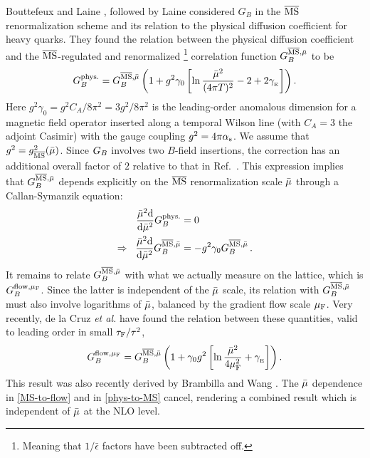 \documentclass[floatfix,twocolumn,prd,showpacs,preprintnumbers,amsmath,nofootinbib,amssymb,superscriptaddress]{revtex4-2}
\def\ccite#1{Ref.~\cite{#1}} %
\begin{document}
Bouttefeux and Laine \cite{Bouttefeux:2020ycy}, followed by Laine \cite{Laine:2021uzs} considered $G_B$ in the $\overline{\text{MS}}$ renormalization scheme and its relation to the physical diffusion coefficient for heavy quarks.
They found the relation between the physical diffusion coefficient and the $\overline{\text{MS}}$-regulated and renormalized%
\footnote{Meaning that $1/\bar\epsilon$ factors have been subtracted off.}
correlation function $G_{B}^{\overline{\text{MS}},\bar{\mu}}$ to be
\begin{equation}
\label{phys-to-MS}
    G_B^{\text{phys.}} = G_{B}^{\overline{\text{MS}},\bar{\mu}} \left( 1 + g^2 \gamma_0 \left[
    \ln \frac{\bar{\mu}^2}{(4\pi T)^2} - 2 + 2 \gamma_{_{\mathrm{E}}}
    \right] \right) .
\end{equation}
Here $g^2 \gamma_0 = g^2 C_A/8\pi^2 = 3g^2/8\pi^2$ is the leading-order anomalous dimension for a magnetic field operator inserted along a temporal Wilson line (with $C_A=3$ the adjoint Casimir) with the gauge coupling $g^2=4\pi \alpha_{\mathrm{s}}$. 
We assume that $g^2 = g^2_{\overline{\text{MS}}}(\bar{\mu})$.
Since $G_B$ involves two $B$-field insertions, the correction has an additional overall factor of $2$ relative to that in \ccite{Laine:2021uzs}.
This expression implies that $G_{B}^{\overline{\text{MS}},\bar{\mu}}$ depends explicitly on the $\overline{\text{MS}}$ renormalization scale $\bar{\mu}$ through a Callan-Symanzik equation:
\begin{align}
\label{CallanSymanzik}
    \frac{\bar{\mu}^2 \mathrm{d}}{\mathrm{d}\bar{\mu}^2} G_B^{\text{phys.}} & = 0 \nonumber \\
    \Rightarrow \;\;
    \frac{\bar{\mu}^2 \mathrm{d}}{\mathrm{d}\bar{\mu}^2} G_{B}^{\overline{\text{MS}},\bar{\mu}} & = - g^2 \gamma_0 G_{B}^{\overline{\text{MS}},\bar{\mu}}\,.
\end{align}
It remains to relate $G_{B}^{\overline{\text{MS}},\bar{\mu}}$ with what we actually measure on the lattice, which is $G_{B}^{\mathrm{flow}, \mu_\mathrm{F}}$.
Since the latter is independent of the $\bar{\mu}$ scale, its relation with $G_{B}^{\overline{\text{MS}},\bar{\mu}}$ must also involve logarithms of $\bar{\mu}$, balanced by the gradient flow scale $\mu_\mathrm{F}$.
Very recently, de la Cruz \textit{et al.} have found the relation \cite{delacruzinprep}
between these quantities, valid to leading order in small $\tau_\mathrm{F}/\tau^2$,
\begin{equation}
\label{MS-to-flow}
    G_{B}^{\mathrm{flow}, \mu_\mathrm{F}} = G_{B}^{\overline{\text{MS}},\bar{\mu}} \left( 1 + \gamma_0 g^2 \left[
    \ln \frac{\bar{\mu}^2 }{4\mu_\mathrm{F}^2} + \gamma_{_{\mathrm{E}}}
    \right] \right).
\end{equation}
This result was also recently derived by Brambilla and Wang
\cite{brambilla2023offlightcone}.
The $\bar{\mu}$ dependence in \cref{MS-to-flow} and in \cref{phys-to-MS} cancel, rendering a combined result which is independent of $\bar{\mu}$ at the NLO level.
\end{document}
